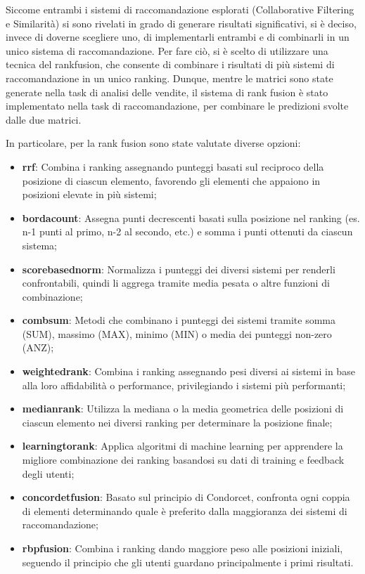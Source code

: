 Siccome entrambi i sistemi di raccomandazione esplorati (Collaborative Filtering e Similarità) si sono rivelati in grado di generare risultati significativi, si è deciso, invece di doverne scegliere uno, di implementarli entrambi e di combinarli in un unico sistema di raccomandazione. Per fare ciò, si è scelto di utilizzare una tecnica del \gls{rankfusion}, che consente di combinare i risultati di più sistemi di raccomandazione in un unico ranking.
Dunque, mentre le matrici sono state generate nella task di analisi delle vendite, il sistema di rank fusion è stato implementato nella task di raccomandazione, per combinare le predizioni svolte dalle due matrici.

In particolare, per la rank fusion sono state valutate diverse opzioni:
\begin{itemize}
    \item \textbf{\gls{rrf}}: Combina i ranking assegnando punteggi basati sul reciproco della posizione di ciascun elemento, favorendo gli elementi che appaiono in posizioni elevate in più sistemi;
    \item \textbf{\gls{bordacount}}: Assegna punti decrescenti basati sulla posizione nel ranking (es. n-1 punti al primo, n-2 al secondo, etc.) e somma i punti ottenuti da ciascun sistema;
    \item \textbf{\gls{scorebasednorm}}: Normalizza i punteggi dei diversi sistemi per renderli confrontabili, quindi li aggrega tramite media pesata o altre funzioni di combinazione;
    \item \textbf{\gls{combsum}}: Metodi che combinano i punteggi dei sistemi tramite somma (SUM), massimo (MAX), minimo (MIN) o media dei punteggi non-zero (ANZ);
    \item \textbf{\gls{weightedrank}}: Combina i ranking assegnando pesi diversi ai sistemi in base alla loro affidabilità o performance, privilegiando i sistemi più performanti;
    \item \textbf{\gls{medianrank}}: Utilizza la mediana o la media geometrica delle posizioni di ciascun elemento nei diversi ranking per determinare la posizione finale;
    \item \textbf{\gls{learningtorank}}: Applica algoritmi di machine learning per apprendere la migliore combinazione dei ranking basandosi su dati di training e feedback degli utenti;
    \item \textbf{\gls{concordetfusion}}: Basato sul principio di Condorcet, confronta ogni coppia di elementi determinando quale è preferito dalla maggioranza dei sistemi di raccomandazione;
    \item \textbf{\gls{rbpfusion}}: Combina i ranking dando maggiore peso alle posizioni iniziali, seguendo il principio che gli utenti guardano principalmente i primi risultati.
\end{itemize}

